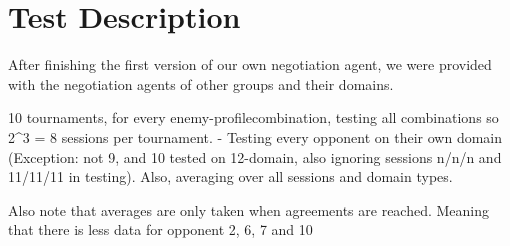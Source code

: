 \section{Test Description}

After finishing the first version of our own negotiation agent, we were provided with the negotiation agents of other groups and their domains.

10 tournaments, for every enemy-profilecombination, testing all combinations so 2^3 = 8 sessions per tournament. - Testing every opponent on their own domain (Exception: not 9, and 10 tested on 12-domain, also ignoring sessions n/n/n and 11/11/11 in testing). Also, averaging over all sessions and domain types.

Also note that averages are only taken when agreements are reached. Meaning that there is less data for opponent 2, 6, 7 and 10